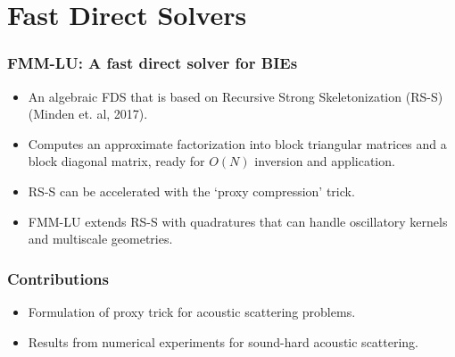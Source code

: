 \section{Fast Direct Solvers}

\begin{frame}
    \frametitle{FMM-LU: A fast direct solver for BIEs}

    \begin{itemize}
        \item An algebraic FDS that is based on Recursive Strong Skeletonization (RS-S) (Minden et. al, 2017).
        \item Computes an approximate factorization into block triangular matrices and a block diagonal matrix, ready for $O(N)$ inversion and application.
        \item RS-S can be accelerated with the `proxy compression' trick.
        \item FMM-LU extends RS-S with quadratures that can handle oscillatory kernels and multiscale geometries.
    \end{itemize}
\end{frame}

\begin{frame}
    \frametitle{Contributions}

    \begin{itemize}
        \item Formulation of proxy trick for acoustic scattering problems.
        \item Results from numerical experiments for sound-hard acoustic scattering.
    \end{itemize}

    \begin{columns}
    \end{columns}
\end{frame}


